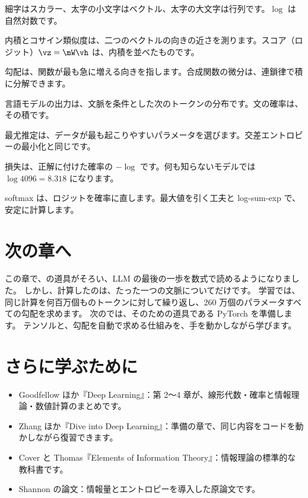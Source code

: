 \begin{summary}
\item 細字はスカラー、太字の小文字はベクトル、太字の大文字は行列です。$\log$ は自然対数です。
\item 内積とコサイン類似度は、二つのベクトルの向きの近さを測ります。スコア（ロジット）$\vz=\mW\vh$ は、内積を並べたものです。
\item 勾配は、関数が最も急に増える向きを指します。合成関数の微分は、連鎖律で積に分解できます。
\item 言語モデルの出力は、文脈を条件とした次のトークンの分布です。文の確率は、その積です。
\item 最尤推定は、データが最も起こりやすいパラメータを選びます。交差エントロピーの最小化と同じです。
\item 損失は、正解に付けた確率の $-\log$ です。何も知らないモデルでは $\log 4096=8.318$ になります。
\item softmax は、ロジットを確率に直します。最大値を引く工夫と log-sum-exp で、安定に計算します。
\end{summary}

\section*{次の章へ}

この章で、の道具がそろい、LLM の最後の一歩を数式で読めるようになりました。
しかし、計算したのは、たった一つの文脈についてだけです。
学習では、同じ計算を何百万個ものトークンに対して繰り返し、260 万個のパラメータすべての勾配を求めます。
次のでは、そのための道具である PyTorch を準備します。
テンソルと、勾配を自動で求める仕組みを、手を動かしながら学びます。

\section*{さらに学ぶために}

\begin{itemize}
\item Goodfellow ほか『Deep Learning』\cite{goodfellow2016deep}：第 2〜4 章が、線形代数・確率と情報理論・数値計算のまとめです。
\item Zhang ほか『Dive into Deep Learning』\cite{zhang2023d2l}：準備の章で、同じ内容をコードを動かしながら復習できます。
\item Cover と Thomas『Elements of Information Theory』\cite{cover2006elements}：情報理論の標準的な教科書です。
\item Shannon の論文\cite{shannon1948mathematical}：情報量とエントロピーを導入した原論文です。
\end{itemize}

